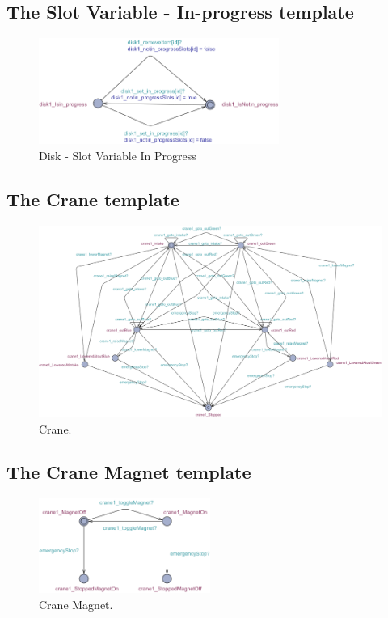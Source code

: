 \subsection{The Slot Variable - In-progress template}
\begin{figure}[H]
    \centering
    \includegraphics[width=0.7\textwidth]{Image/uppaal-templates/disk1_SlotVariable_in_progress.png}
    \caption{Disk - Slot Variable In Progress}
    \label{fig:slot_variable_in_progress}
\end{figure}

\subsection{The Crane template}
\begin{figure}[H]
    \centering
    \includegraphics[width=\textwidth]{Image/uppaal-templates/crane1.png}
    \caption{Crane.}
    \label{fig:crane}
\end{figure}

\subsection{The Crane Magnet template}
\begin{figure}[H]
    \centering
    \includegraphics[width=0.5\textwidth]{Image/uppaal-templates/crane1_CraneMagnet.png}
    \caption{Crane Magnet.}
    \label{fig:crane_magnet}
\end{figure}

